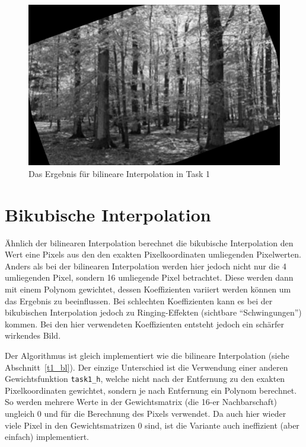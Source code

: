 \begin{figure}[htb]
 \centering
 \includegraphics{./img/t1_bl.png}
 \caption{Das Ergebnis für bilineare Interpolation in Task 1}
 \label{fig:t1_bl}
\end{figure}

\clearpage



\section{Bikubische Interpolation}

Ähnlich der bilinearen Interpolation berechnet die bikubische Interpolation den Wert eine Pixels aus den den exakten Pixelkoordinaten umliegenden Pixelwerten. Anders als bei der bilinearen Interpolation werden hier jedoch nicht nur die 4 umliegenden Pixel, sondern 16 umliegende Pixel betrachtet. Diese werden dann mit einem Polynom gewichtet, dessen Koeffizienten variiert werden können um das Ergebnis zu beeinflussen. Bei schlechten Koeffizienten kann es bei der bikubischen Interpolation jedoch zu Ringing-Effekten (sichtbare ``Schwingungen'') kommen. Bei den hier verwendeten Koeffizienten entsteht jedoch ein schärfer wirkendes Bild.

Der Algorithmus ist gleich implementiert wie die bilineare Interpolation (siehe Abschnitt~\ref{t1_bl}). Der einzige Unterschied ist die Verwendung einer anderen Gewichtsfunktion \texttt{task1\_h}, welche nicht nach der Entfernung zu den exakten Pixelkoordinaten gewichtet, sondern je nach Entfernung ein Polynom berechnet. So werden mehrere Werte in der Gewichtsmatrix (die 16-er Nachbarschaft) ungleich 0 und für die Berechnung des Pixels verwendet. Da auch hier wieder viele Pixel in den Gewichtsmatrizen 0 sind, ist die Variante auch ineffizient (aber einfach) implementiert.

